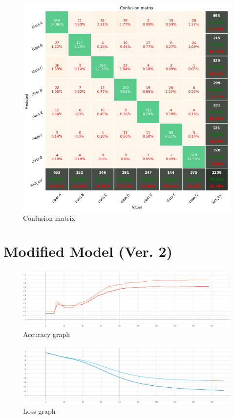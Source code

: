 \begin{figure}[htbp]
\centering
\includegraphics[width=0.6\linewidth]{evaluation/fig/confusion1.png}
\caption{Confusion matrix}
\label{fig:confusion1}
\end{figure}

\newpage
\section{Modified Model (Ver. 2)}

\begin{figure}[htbp]
\centering
\includegraphics[width=0.7\linewidth]{evaluation/fig/Accuracy2.png}
\caption{Accuracy graph}
\label{fig:accuracy2}
\end{figure}

\begin{figure}[htbp]
\centering
\includegraphics[width=0.7\linewidth]{evaluation/fig/Loss2.png}
\caption{Loss graph}
\label{fig:evaluation2}
\end{figure}

